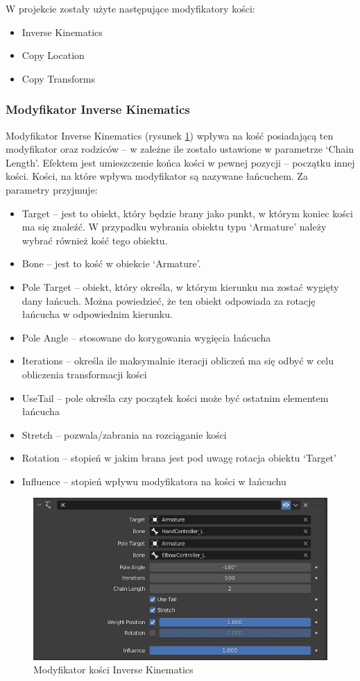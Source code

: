 \documentclass[12pt,twoside]{article}
\begin{document}
W projekcie zostały użyte następujące modyfikatory kości:
\begin{itemize}
\item Inverse Kinematics 
\item Copy Location  
\item Copy Transforms
\end{itemize}
\subsubsection{Modyfikator Inverse Kinematics}
Modyfikator Inverse Kinematics (rysunek \ref{Blender:IK}) wpływa na kość
posiadającą ten modyfikator oraz rodziców -- w zależne ile zostało ustawione w
parametrze `Chain Length'. Efektem jest umieszczenie końca kości w pewnej
pozycji -- początku innej kości. Kości, na które wpływa modyfikator są nazywane
łańcuchem. Za parametry przyjmuje:
\begin{itemize}
\item Target -- jest to obiekt, który będzie brany jako punkt, w którym koniec kości ma się znaleźć. W przypadku wybrania obiektu typu `Armature' należy wybrać również kość tego obiektu.
\item Bone -- jest to kość w obiekcie `Armature'. 
\item Pole Target -- obiekt, który określa, w którym kierunku ma zostać wygięty dany łańcuch. Można powiedzieć, że ten obiekt odpowiada za rotację łańcucha w odpowiednim kierunku.
\item Pole Angle -- stosowane do korygowania wygięcia łańcucha
\item Iterations -- określa ile maksymalnie iteracji obliczeń ma się odbyć w celu obliczenia transformacji kości
\item UseTail -- pole określa czy początek kości może być ostatnim elementem łańcucha
\item Stretch -- pozwala/zabrania na rozciąganie kości
\item Rotation -- stopień w jakim brana jest pod uwagę rotacja obiektu `Target'
\item Influence -- stopień wpływu modyfikatora na kości w łańcuchu
\end{itemize}
\begin{figure}[ht!]
    \centering
    \includegraphics[width=12cm]{BlenderPict/Constraints_IK.jpg}
    \caption{Modyfikator kości Inverse Kinematics}
    \label{Blender:IK}
\end{figure}
\end{document}
